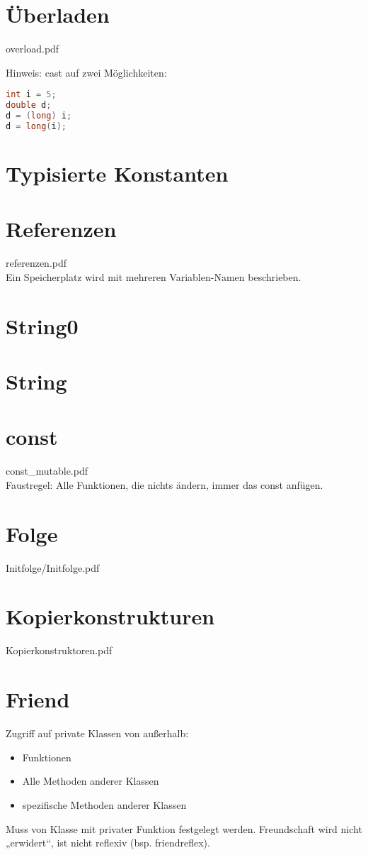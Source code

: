 \section{Überladen}
overload.pdf

Hinweis: cast auf zwei Möglichkeiten:
\begin{lstlisting}[language=C++]
int i = 5;
double d;
d = (long) i;
d = long(i);
\end{lstlisting}

\section{Typisierte Konstanten}

\section{Referenzen}
referenzen.pdf\\
Ein Speicherplatz wird mit mehreren Variablen-Namen beschrieben.

\section{String0}
\section{String}
\section{const}
const\_mutable.pdf\\
Faustregel: Alle Funktionen, die nichts ändern, immer das const anfügen.
\section{Folge}
Initfolge/Initfolge.pdf
\section{Kopierkonstrukturen}
Kopierkonstruktoren.pdf

\section{Friend}
Zugriff auf private Klassen von außerhalb:
\begin{itemize}
\item Funktionen
\item Alle Methoden anderer Klassen
\item spezifische Methoden anderer Klassen
\end{itemize}
Muss von Klasse mit privater Funktion festgelegt werden. Freundschaft wird nicht „erwidert“, ist nicht reflexiv (bsp. friendreflex).

